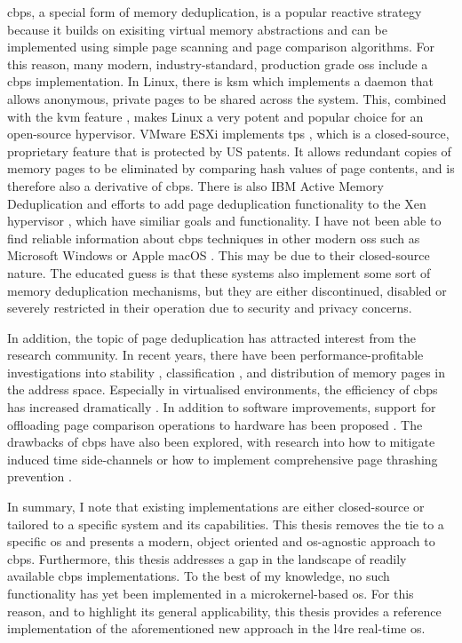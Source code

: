 \Acf{cbps}, a special form of memory deduplication, is a popular reactive strategy because it builds on exisiting virtual memory abstractions and can be implemented using simple page scanning and page comparison algorithms.
For this reason, many modern, industry-standard, production grade \acp{os} include a \ac{cbps} implementation.
In Linux, there is \ac{ksm} \cite{ksm} which implements a daemon that allows anonymous, private pages to be shared across the system.
This, combined with the \ac{kvm} feature \cite{kvm}, makes Linux a very potent and popular choice for an open-source hypervisor.
VMware ESXi implements \ac{tps} \cite{vmware-tps2021}, which is a closed-source, proprietary feature that is protected by US patents.
It allows redundant copies of memory pages to be eliminated by comparing hash values of page contents, and is therefore also a derivative of \ac{cbps}.
There is also IBM Active Memory Deduplication \cite{ibm-amd2012} and efforts to add page deduplication functionality to the Xen hypervisor \cite{vmdedup2014}, which have similiar goals and functionality.
I have not been able to find reliable information about \ac{cbps} techniques in other modern \acp{os} such as Microsoft Windows \cite{microsoft-windows} or Apple macOS \cite{apple-macos}.
This may be due to their closed-source nature.
The educated guess is that these systems also implement some sort of memory deduplication mechanisms, but they are either discontinued, disabled or severely restricted in their operation due to security and privacy concerns.

In addition, the topic of page deduplication has attracted interest from the research community.
In recent years, there have been performance-profitable investigations into stability \cite{spm-page-stability2016, spm-page-stability2017}, classification \cite{spm-classification2014}, and distribution \cite{spm-distribution2019} of memory pages in the address space.
Especially in virtualised environments, the efficiency of \ac{cbps} has increased dramatically \cite{spm-virtualisation2012}.
In addition to software improvements, support for offloading page comparison operations to hardware has been proposed \cite{spm-hardware2019}.
The drawbacks of \ac{cbps} have also been explored, with research into how to mitigate induced time side-channels \cite{spm-side-channels2018} or how to implement comprehensive page thrashing prevention \cite{spm-thrashing2016}.

In summary, I note that existing implementations are either closed-source or tailored to a specific system and its capabilities.
This thesis removes the tie to a specific \ac{os} and presents a modern, object oriented and \ac{os}-agnostic approach to \ac{cbps}.
Furthermore, this thesis addresses a gap in the landscape of readily available \ac{cbps} implementations.
To the best of my knowledge, no such functionality has yet been implemented in a microkernel-based \ac{os}.
For this reason, and to highlight its general applicability, this thesis provides a reference implementation of the aforementioned new approach in the \ac{l4re} real-time \ac{os}.

